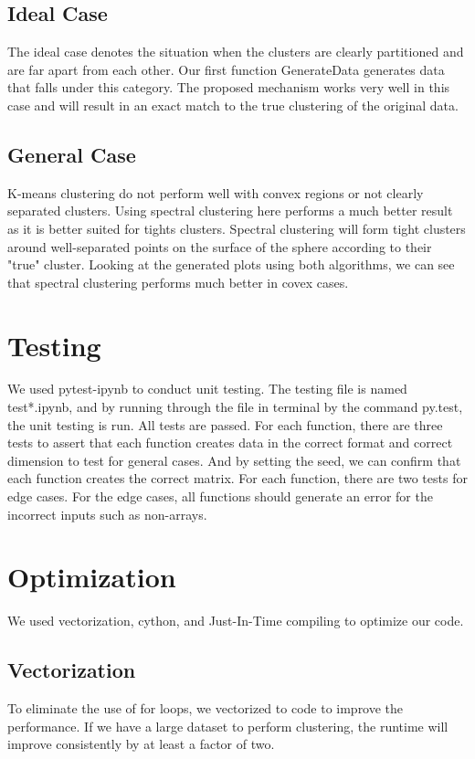 \documentclass[11pt]{article}
\begin{document}
\subsection{Ideal Case}
The ideal case denotes the situation when the clusters are clearly partitioned and are far apart from each other. Our first function GenerateData generates data that falls under this category. The proposed mechanism works very well in this case and will result in an exact match to the true clustering of the original data.
\subsection{General Case}
K-means clustering do not perform well with convex regions or not clearly separated clusters. Using spectral clustering here performs a much better result as it is better suited for tights clusters. Spectral clustering will form tight clusters around well-separated points on the surface of the sphere according to their "true" cluster. Looking at the generated plots using both algorithms, we can see that spectral clustering performs much better in covex cases.

\section{Testing}
We used pytest-ipynb to conduct unit testing. The testing file is named test*.ipynb, and by running through the file in terminal by the command py.test, the unit testing is run. All tests are passed. For each function, there are three tests to assert that each function creates data in the correct format and correct dimension to test for general cases. And by setting the seed, we can confirm that each function creates the correct matrix. For each function, there are two tests for edge cases. For the edge cases, all functions should generate an error for the incorrect inputs such as non-arrays. 

\section{Optimization}
We used vectorization, cython, and Just-In-Time compiling to optimize our code.
\subsection{Vectorization}
To eliminate the use of for loops, we vectorized to code to improve the performance. If we have a large dataset to perform clustering, the runtime will improve consistently by at least a factor of two.
\end{document}

